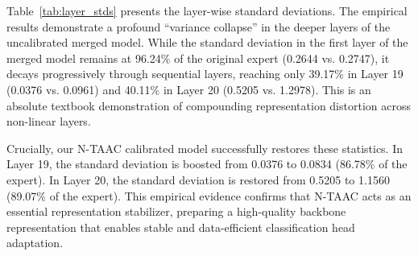 \documentclass{article}
\theoremstyle{plain}
\theoremstyle{definition}
\theoremstyle{remark}
\begin{document}
Table~\ref{tab:layer_stds} presents the layer-wise standard deviations. The empirical results demonstrate a profound ``variance collapse'' in the deeper layers of the uncalibrated merged model. While the standard deviation in the first layer of the merged model remains at 96.24\% of the original expert (0.2644 vs. 0.2747), it decays progressively through sequential layers, reaching only 39.17\% in Layer 19 (0.0376 vs. 0.0961) and 40.11\% in Layer 20 (0.5205 vs. 1.2978). This is an absolute textbook demonstration of compounding representation distortion across non-linear layers.

Crucially, our N-TAAC calibrated model successfully restores these statistics. In Layer 19, the standard deviation is boosted from 0.0376 to 0.0834 (86.78\% of the expert). In Layer 20, the standard deviation is restored from 0.5205 to 1.1560 (89.07\% of the expert). This empirical evidence confirms that N-TAAC acts as an essential representation stabilizer, preparing a high-quality backbone representation that enables stable and data-efficient classification head adaptation.
\end{document}
